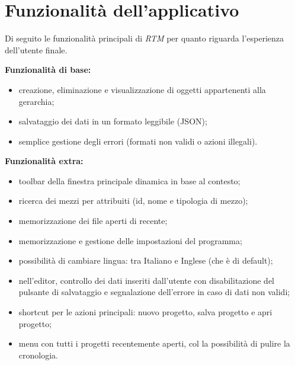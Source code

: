 \documentclass[a4paper,10pt]{article}
\newcommand{\RTM}{\emph{RTM }}
\begin{document}
\section{Funzionalità dell'applicativo}
Di seguito le funzionalità principali di \RTM per quanto riguarda l'esperienza dell'utente finale.
\begin{multicols}{2}

{\bfseries Funzionalità di base:}
    \begin{itemize}
    \item creazione, eliminazione e visualizzazione di oggetti appartenenti alla 
    gerarchia;
    
    \item salvataggio dei dati in un formato leggibile (JSON);
    
    \item semplice gestione degli errori (formati non validi o azioni illegali).
    \end{itemize}

{\bfseries Funzionalità extra:}
    \begin{itemize}
    \item toolbar della finestra principale dinamica in base al contesto;
    
    \item ricerca dei mezzi per attribuiti (id, nome e tipologia di mezzo);
    
    \item memorizzazione dei file aperti di recente;
    
    \item memorizzazione e gestione delle impostazioni del programma;
    
    \item possibilità di cambiare lingua: tra Italiano e Inglese (che è di default);
    
    \item nell'editor, controllo dei dati inseriti dall'utente
    con disabilitazione del pulsante di salvataggio e segnalazione dell'errore
    in caso di dati non validi;
    
    \item shortcut per le azioni principali: nuovo progetto, salva progetto e
    apri progetto;
    
    \item menu con tutti i progetti recentemente aperti, col la possibilità di
    pulire la cronologia.
    \end{itemize}
\end{multicols}
\end{document}
